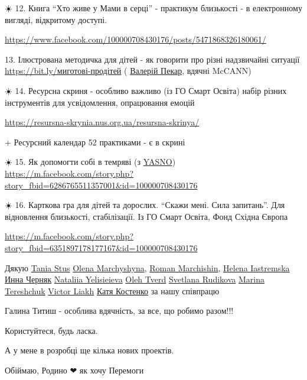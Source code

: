 ☀️ 12. Книга \enquote{Хто живе у Мами в серці} - практикум близькості - в електронному
вигляді, відкритому доступі.

\url{https://www.facebook.com/100000708430176/posts/5471868326180061/}

13. Ілюстрована методичка для дітей - як говорити про різні надзвичайні
ситуації  \url{https://bit.ly/миготові-продітей} ( \href{https://www.facebook.com/valerii.pekar}{Валерій Пекар}, вдячні McCANN)

☀️ 14. Ресурсна скриня - особливо важливо (із ГО Смарт Освіта) набір різних
інструментів для усвідомлення, опрацювання емоцій

\url{https://resursna-skrynia.nus.org.ua/resursna-skrinya/}

+ Ресурсний календар 52 практиками - є в скрині 

☀️ 15. Як допомогти собі в темряві (з \href{https://www.facebook.com/yasno.com.ua}{YASNO}) 
\url{https://m.facebook.com/story.php?story_fbid=6286765511357001&id=100000708430176}

☀️ 16. Карткова гра для дітей та дорослих. \enquote{Скажи мені. Сила запитань}. Для
відновлення близькості, стабілізації. Із ГО Смарт Освіта, Фонд Східна Європа

\url{https://m.facebook.com/story.php?story_fbid=6351897178177167&id=100000708430176}

Дякую \href{https://www.facebook.com/tetiana.stus}{Tania Stus}
\href{https://www.facebook.com/olena.marchishina}{Olena Marchyshyna},
\href{https://www.facebook.com/profile.php?id=100006382174727}{Roman
Marchishin}, \href{https://www.facebook.com/helena.iastremska}{Helena Iastremska} 
\href{https://www.facebook.com/profile.php?id=100001228298697}{Инна Черняк} 
\href{https://www.facebook.com/profile.php?id=100001397504932}{Nataliia Yelisieieva} 
\href{https://www.facebook.com/profile.php?id=100004425577587}{Oleh Tverd}
\href{https://www.facebook.com/svetlana.rudikova}{Svetlana Rudikova} 
\href{https://www.facebook.com/marina.tereshchuk.14}{Marina Tereshchuk} 
\href{https://www.facebook.com/victor8o8victor}{Victor Liakh} \href{https://www.facebook.com/kateryna1234}{Катя Костенко} за нашу
співпрацю

Галина Титиш - особлива вдячність, за все, що робимо разом!!!

Користуйтеся, будь ласка. 

А у мене в розробці ще кілька нових проектів. 

Обіймаю, Родино ❤ як хочу Перемоги

